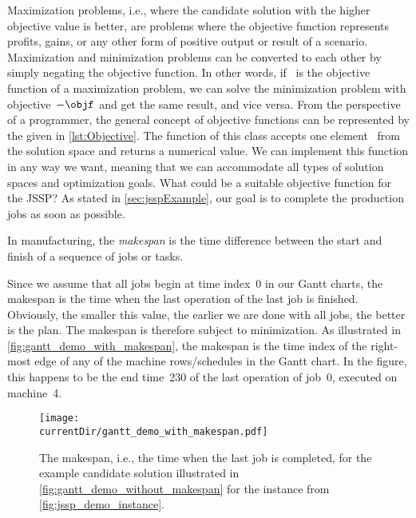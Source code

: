 Maximization problems, i.e., where the candidate solution with the higher objective value is better, are problems where the objective function represents profits, gains, or any other form of positive output or result of a scenario.
Maximization and minimization problems can be converted to each other by simply negating the objective function.
In other words, if \objf~is the objective function of a maximization problem, we can solve the minimization problem with objective~$-\objf$ and get the same result, and vice versa.%
%
\endhsection%
%
%
%
From the perspective of a programmer, the general concept of objective functions can be represented by the  given in \autoref{lst:Objective}.
The  function of this class accepts one element~ from the solution space and returns a numerical value.
We can implement this function in any way we want, meaning that we can accommodate all types of solution spaces and optimization goals.%
%
%
%
\endhsection%
%
%
\label{sec:jsspObjectiveFunction}%
%
What could be a suitable objective function for the \gls{JSSP}?
As stated in \autoref{sec:jsspExample}, our goal is to complete the production jobs as soon as possible.%
%
\begin{definition}[Makespan]%
\label{def:makespan}%
In manufacturing, the \emph{makespan} is the time difference between the start and finish of a sequence of jobs or tasks.%
\end{definition}%
%
Since we assume that all jobs begin at time index~0 in our Gantt charts, the makespan is the time when the last operation of the last job is finished.
Obviously, the smaller this value, the earlier we are done with all jobs, the better is the plan.
The makespan is therefore subject to minimization.
As illustrated in \autoref{fig:gantt_demo_with_makespan}, the makespan is the time index of the right-most edge of any of the machine rows/schedules in the Gantt chart.
In the figure, this happens to be the end time~230 of the last operation of job~0, executed on machine~4.

\begin{figure}%
\centering%
\texttt{[image: \\currentDir/gantt\_demo\_with\_makespan.pdf]}%
\caption{The makespan, i.e., the time when the last job is completed, for the example candidate solution illustrated in \autoref{fig:gantt_demo_without_makespan} for the  instance from \autoref{fig:jssp_demo_instance}.}%
\label{fig:gantt_demo_with_makespan}%
\end{figure}

